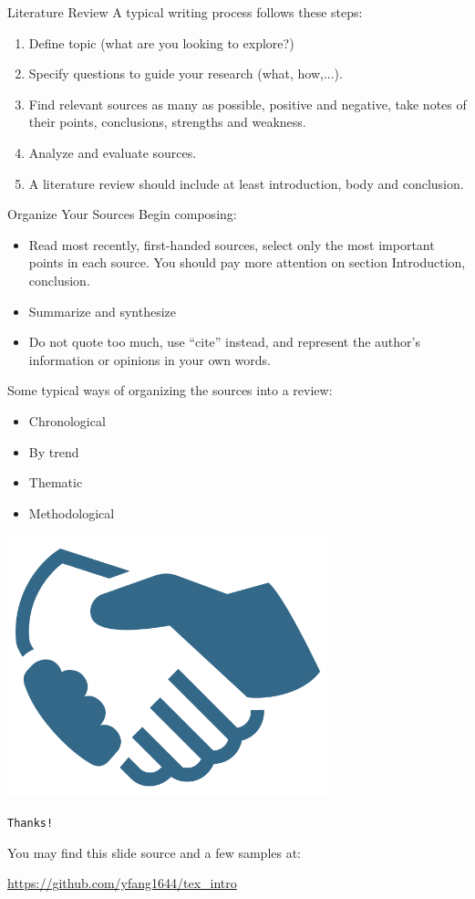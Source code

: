 \documentclass[10pt]{beamer}
\begin{document}
\begin{frame}[t]{Literature Review}
A typical writing process follows these steps:
\begin{enumerate}
    \item Define topic (what are you looking to explore?)
    \item Specify questions to guide your research (what, how,...).
    \item Find relevant sources as many as possible, positive
        and negative, take notes of their points, conclusions,
        strengths and weakness.
    \item Analyze and evaluate sources.
    \item A literature review should include at least introduction,
        body and conclusion.
\end{enumerate}
\end{frame}

\begin{frame}[t]{Organize Your Sources}
Begin composing:
\begin{itemize}
    \item Read most recently, first-handed sources, select only
        the most important points in each source. You should pay
        more attention on section \alert{Introduction},
        \alert{conclusion}.
    \item Summarize and synthesize
    \item Do not quote too much, use ``\alert{cite}'' instead, and
        represent the author's information or opinions in your own words.
\end{itemize}
Some typical ways of organizing the sources into a review:
\begin{itemize}
    \item Chronological
    \item By trend
    \item Thematic
    \item Methodological
\end{itemize}
\end{frame}

\begin{frame}
\begin{center}
\includegraphics[width=.5\textwidth]{shakinghands.png}

\texttt{\Huge Thanks!}
\end{center}
\vfill

You may find this slide source and a few samples at:

   \url{https://github.com/yfang1644/tex_intro}
\end{frame}
\end{document}
